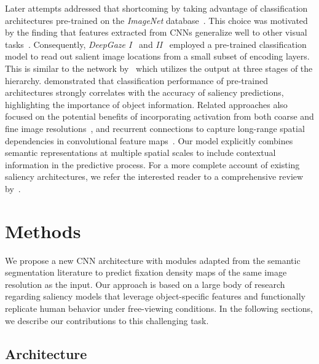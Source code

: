 \documentclass[final,1p,times,number]{elsarticle}
\begin{document}
Later attempts addressed that shortcoming by taking advantage of classification architectures pre-trained on the \textit{ImageNet} database~\cite{deng2009imagenet}. This choice was motivated by the finding that features extracted from CNNs generalize well to other visual tasks~\cite{donahue2014decaf}. Consequently, \textit{DeepGaze I}~\cite{kummerer2014deep} and \textit{II}~\cite{kummerer2016deepgaze} employed a pre-trained classification model to read out salient image locations from a small subset of encoding layers. This is similar to the network by~\citet{cornia2016deep} which utilizes the output at three stages of the hierarchy. \citet{oyama2018influence} demonstrated that classification performance of pre-trained architectures strongly correlates with the accuracy of saliency predictions, highlighting the importance of object information. Related approaches also focused on the potential benefits of incorporating activation from both coarse and fine image resolutions~\cite{huang2015salicon}, and recurrent connections to capture long-range spatial dependencies in convolutional feature maps~\cite{Cornia2018PredictingHE,liu2018deep}. Our model explicitly combines semantic representations at multiple spatial scales to include contextual information in the predictive process. For a more complete account of existing saliency architectures, we refer the interested reader to a comprehensive review by~\citet{borji2018saliency}.

\section{Methods}

We propose a new CNN architecture with modules adapted from the semantic segmentation literature to predict fixation density maps of the same image resolution as the input. Our approach is based on a large body of research regarding saliency models that leverage object-specific features and functionally replicate human behavior under free-viewing conditions. In the following sections, we describe our contributions to this challenging task.

\subsection{Architecture}
\end{document}

